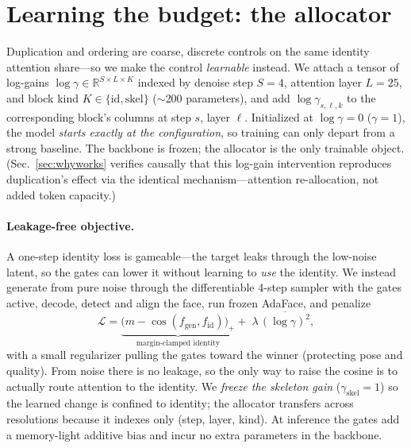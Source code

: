 \section{Learning the budget: the \gate{} allocator}
\label{sec:learned}
Duplication and ordering are coarse, discrete controls on the same identity
attention share---so we make the control \emph{learnable} instead. We attach a
tensor of log-gains
$\log\gamma\in\mathbb{R}^{S\times L\times K}$ indexed by denoise step $S{=}4$,
attention layer $L{=}25$, and block kind $K{\in}\{\mathrm{id},\mathrm{skel}\}$
($\sim$200 parameters), and add $\log\gamma_{s,\ell,k}$ to the corresponding
block's columns at step $s$, layer $\ell$. Initialized at $\log\gamma{=}0$
($\gamma{=}1$), the model \emph{starts exactly at the \dupid{} configuration}, so
training can only depart from a strong baseline. The backbone is frozen; the
allocator is the only trainable object. (Sec.~\ref{sec:whyworks} verifies
causally that this log-gain intervention reproduces duplication's effect via
the identical mechanism---attention re-allocation, not added token capacity.)

\paragraph{Leakage-free objective.} A one-step identity loss is gameable---the
target leaks through the low-noise latent, so the gates can lower it without
learning to \emph{use} the identity. We instead generate from pure noise through
the differentiable 4-step sampler with the gates active, decode, detect and align
the face, run frozen AdaFace, and penalize
\begin{equation}
\mathcal{L}=\underbrace{\big(m-\cos(f_{\mathrm{gen}},f_{\mathrm{id}})\big)_{+}}_{\text{margin-clamped identity}}+\;\lambda\,\overline{(\log\gamma)^2},
\label{eq:gateloss}
\end{equation}
with a small regularizer pulling the gates toward the winner (protecting pose and
quality).  From noise there is no leakage, so the only way to raise the cosine is
to actually route attention to the identity. We \emph{freeze the skeleton gain}
($\gamma_{\mathrm{skel}}{=}1$) so the learned change is confined to identity; the
allocator transfers across resolutions because it indexes only (step, layer,
kind). At inference the gates add a memory-light additive bias and incur no
extra parameters in the backbone.

